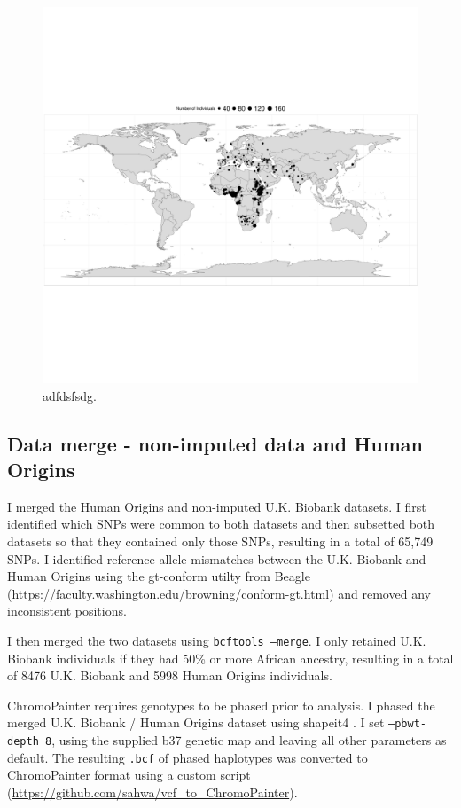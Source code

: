 {\begin{figure}
    \centering
    \includegraphics[width=1.0\textwidth]{../images/chapter3/HumanOriginsMap.pdf}
    \caption{adfdsfsdg.}
    \label{fig:HumanOriginsMap}
\end{figure}

\subsection{Data merge - non-imputed data and Human Origins}

I merged the Human Origins and non-imputed U.K. Biobank datasets. I first identified which SNPs were common to both datasets and then subsetted both datasets so that they contained only those SNPs, resulting in a total of 65,749 SNPs. I identified reference allele mismatches between the U.K. Biobank and Human Origins using the gt-conform utilty from Beagle (\url{https://faculty.washington.edu/browning/conform-gt.html}) and removed any inconsistent positions. 

I then merged the two datasets using \texttt{bcftools --merge}. I only retained U.K. Biobank individuals if they had 50\% or more African ancestry, resulting in a total of 8476 U.K. Biobank and 5998 Human Origins individuals. 

ChromoPainter requires genotypes to be phased prior to analysis. I phased the merged U.K. Biobank / Human Origins dataset using shapeit4 \cite{delaneau2018integrative}. I set \texttt{--pbwt-depth 8}, using the supplied b37 genetic map and leaving all other parameters as default. The resulting \texttt{.bcf} of phased haplotypes was converted to ChromoPainter format using a custom script (\url{https://github.com/sahwa/vcf_to_ChromoPainter}).

}
